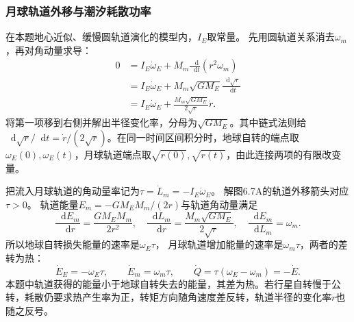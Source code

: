 \documentclass[UTF8,fontset=fandol,a4paper,11pt]{ctexart}
\newcommand{\dd}{\mathop{}\!\mathrm{d}}
\begin{document}
\subsubsection*{月球轨道外移与潮汐耗散功率}
在本题地心近似、缓慢圆轨道演化的模型内，$I_E$取常量。
先用圆轨道关系消去$\omega_m$，再对角动量求导：
\[
\begin{aligned}
0&=I_E\dot\omega_E+M_m\frac{\dd}{\dd t}(r^2\omega_m)\\
&=I_E\dot\omega_E+M_m\sqrt{GM_E}\frac{\dd\sqrt r}{\dd t}\\
&=I_E\dot\omega_E+\frac{M_m\sqrt{GM_E}}{2\sqrt r}\dot r.
\end{aligned}
\]
将第一项移到右侧并解出半径变化率，分母为$\sqrt{GM_E}$。其中链式法则给$\dd\sqrt r/\dd t=\dot r/(2\sqrt r)$。在同一时间区间积分时，地球自转的端点取$\omega_E(0),\omega_E(t)$，月球轨道端点取$\sqrt{r(0)},\sqrt{r(t)}$，由此连接两项的有限改变量。

把流入月球轨道的角动量率记为$\tau=\dot L_m=-I_E\dot\omega_E$。
解图6.7A的轨道外移箭头对应$\tau>0$。
轨道能量$E_m=-GM_EM_m/(2r)$与轨道角动量满足
\[
\frac{\dd E_m}{\dd r}=\frac{GM_EM_m}{2r^2},
\quad
\frac{\dd L_m}{\dd r}=\frac{M_m\sqrt{GM_E}}{2\sqrt r},
\quad
\frac{\dd E_m}{\dd L_m}=\omega_m.
\]
所以地球自转损失能量的速率是$\omega_E\tau$，
月球轨道增加能量的速率是$\omega_m\tau$，两者的差转为热：
\[
\dot E_E=-\omega_E\tau,\qquad
\dot E_m=\omega_m\tau,\qquad
\dot Q=\tau(\omega_E-\omega_m)=-\dot E.
\]
本题中轨道获得的能量小于地球自转失去的能量，其差为热。若行星自转慢于公转，耗散仍要求热产生率为正，转矩方向随角速度差反转，轨道半径的变化率$\dot r$也随之反号。
\end{document}
